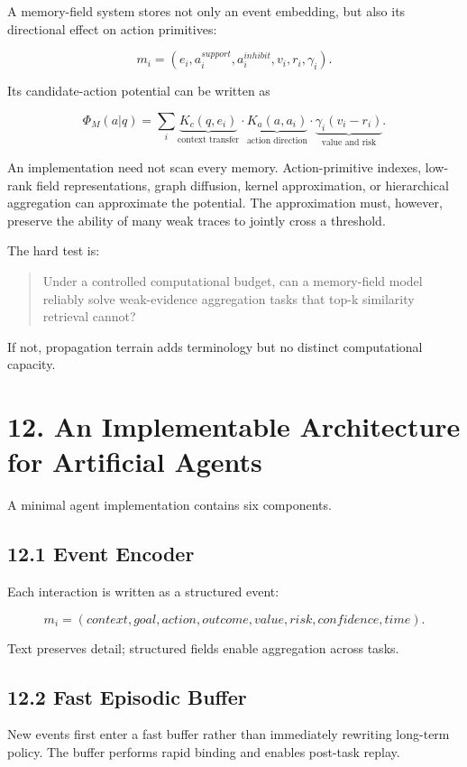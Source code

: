 \documentclass[11pt, a4paper]{article}
\begin{document}
A memory-field system stores not only an event embedding, but also its directional effect on action primitives:

\[
m_i=(e_i,a_i^{support},a_i^{inhibit},v_i,r_i,\gamma_i).
\]

Its candidate-action potential can be written as

\[
\Phi_M(a|q)=\sum_i
\underbrace{K_c(q,e_i)}_{\text{context transfer}}
\cdot\underbrace{K_a(a,a_i)}_{\text{action direction}}
\cdot\underbrace{\gamma_i(v_i-r_i)}_{\text{value and risk}}.
\]

An implementation need not scan every memory. Action-primitive indexes, low-rank field representations, graph diffusion, kernel approximation, or hierarchical aggregation can approximate the potential. The approximation must, however, preserve the ability of many weak traces to jointly cross a threshold.

The hard test is:

\begin{quote}
Under a controlled computational budget, can a memory-field model reliably solve weak-evidence aggregation tasks that top-k similarity retrieval cannot?
\end{quote}

If not, propagation terrain adds terminology but no distinct computational capacity.


\section{12. An Implementable Architecture for Artificial Agents}

A minimal agent implementation contains six components.

\subsection{12.1 Event Encoder}

Each interaction is written as a structured event:

\[
m_i=(context,goal,action,outcome,value,risk,confidence,time).
\]

Text preserves detail; structured fields enable aggregation across tasks.

\subsection{12.2 Fast Episodic Buffer}

New events first enter a fast buffer rather than immediately rewriting long-term policy. The buffer performs rapid binding and enables post-task replay.
\end{document}
